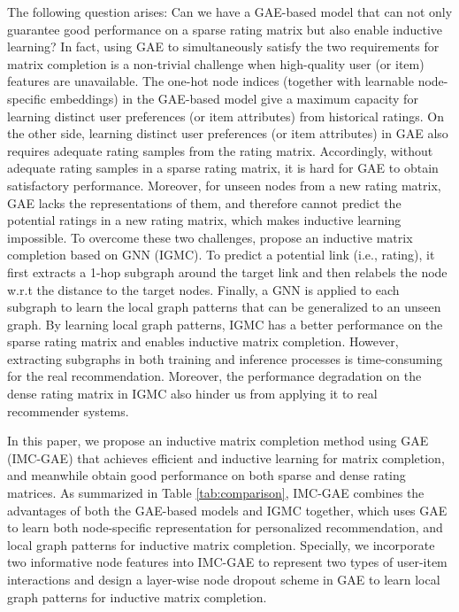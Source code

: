 \documentclass[sigconf]{acmart}
\begin{document}
The following question arises: Can we have a GAE-based model that can not only guarantee good performance on a sparse rating matrix but also enable inductive learning? In fact, using GAE to simultaneously satisfy the two requirements for matrix completion is a non-trivial challenge when high-quality user (or item) features are unavailable. The one-hot node indices (together with learnable node-specific embeddings) in the GAE-based model give a maximum capacity for learning distinct user preferences (or item attributes) from historical ratings. On the other side, learning distinct user preferences (or item attributes) in GAE also requires adequate rating samples from the rating matrix. Accordingly, without adequate rating samples in a sparse rating matrix, it is hard for GAE to obtain satisfactory performance. Moreover, for unseen nodes from a new rating matrix, GAE lacks the representations of them, and therefore cannot predict the potential ratings in a new rating matrix, which makes inductive learning impossible. To overcome these two challenges, \citet{zhang2019inductive} propose an inductive matrix completion based on GNN (IGMC). To predict a potential link (i.e., rating), it first extracts a 1-hop subgraph around the target link and then relabels the node w.r.t the distance to the target nodes. Finally, a GNN is applied to each subgraph to learn the local graph patterns that can be generalized to an unseen graph. By learning local graph patterns, IGMC has a better performance on the sparse rating matrix and enables inductive matrix completion. However, extracting subgraphs in both training and inference processes is time-consuming for the real recommendation. Moreover, the performance degradation on the dense rating matrix in IGMC also hinder us from applying it to real recommender systems. 











In this paper, we propose an inductive matrix completion method using GAE (IMC-GAE) that achieves efficient and inductive learning for matrix completion, and meanwhile obtain good performance on both sparse and dense rating matrices. As summarized in Table \ref{tab:comparison}, IMC-GAE combines the advantages of both the GAE-based models and IGMC together, which uses GAE to learn both node-specific representation for personalized recommendation, and local graph patterns for inductive matrix completion. Specially, we incorporate two informative node features into IMC-GAE to represent two types of user-item interactions and design a layer-wise node dropout scheme in GAE to learn local graph patterns for inductive matrix completion. 
\end{document}
